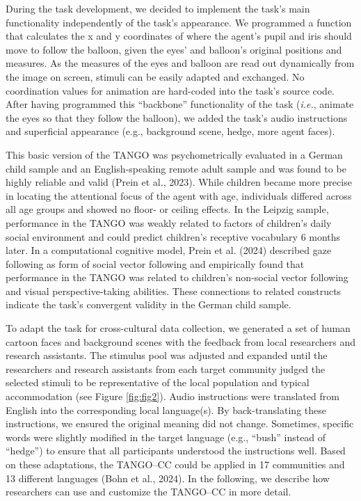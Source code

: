 \documentclass[
  man,floatsintext]{apa7}
\begin{document}
During the task development, we decided to implement the task's main functionality independently of the task's appearance. We programmed a function that calculates the x and y coordinates of where the agent's pupil and iris should move to follow the balloon, given the eyes' and balloon's original positions and measures. As the measures of the eyes and balloon are read out dynamically from the image on screen, stimuli can be easily adapted and exchanged. No coordination values for animation are hard-coded into the task's source code. After having programmed this ``backbone'' functionality of the task (\emph{i.e.}, animate the eyes so that they follow the balloon), we added the task's audio instructions and superficial appearance (e.g., background scene, hedge, more agent faces).

This basic version of the TANGO was psychometrically evaluated in a German child sample and an English-speaking remote adult sample and was found to be highly reliable and valid (Prein et al., 2023).
While children became more precise in locating the attentional focus of the agent with age, individuals differed across all age groups and showed no floor- or ceiling effects.
In the Leipzig sample, performance in the TANGO was weakly related to factors of children's daily social environment and could predict children's receptive vocabulary 6 months later.
In a computational cognitive model, Prein et al. (2024) described gaze following as form of social vector following and empirically found that performance in the TANGO was related to children's non-social vector following and visual perspective-taking abilities.
These connections to related constructs indicate the task's convergent validity in the German child sample.

To adapt the task for cross-cultural data collection, we generated a set of human cartoon faces and background scenes with the feedback from local researchers and research assistants.
The stimulus pool was adjusted and expanded until the researchers and research assistants from each target community judged the selected stimuli to be representative of the local population and typical accommodation (see Figure \ref{fig:fig2}).
Audio instructions were translated from English into the corresponding local language(s).
By back-translating these instructions, we ensured the original meaning did not change.
Sometimes, specific words were slightly modified in the target language (e.g., ``bush'' instead of ``hedge'') to ensure that all participants understood the instructions well.
Based on these adaptations, the TANGO--CC could be applied in 17 communities and 13 different languages (Bohn et al., 2024). In the following, we describe how researchers can use and customize the TANGO--CC in more detail.
\end{document}

